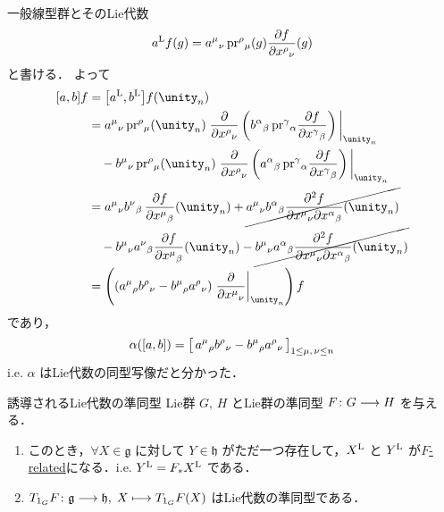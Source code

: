 \documentclass[TQFT_main]{subfiles}
\begin{document}
\begin{myexample}[label=ex:gl]{一般線型群とそのLie代数}
    \begin{align}
        a^{\mathrm{L}} f(g) = a^\mu{}_\nu\, \mathrm{pr}^\rho{}_\mu(g) \pdv{f}{x^\rho{}_\nu}()(g)
    \end{align}
    と書ける．
    よって
    \begin{align}
        \comm{a}{b} f
        &= \comm{\Lie{a}}{\Lie{b}} f (\unity_n)\\
        &= a^\mu{}_\nu\, \mathrm{pr}^\rho{}_\mu(\unity_n) \eval{\pdv{}{x^\rho{}_\nu}\left(b^\alpha{}_\beta\, \mathrm{pr}^\gamma{}_\alpha \pdv{f}{x^\gamma{}_\beta} \right)}_{\unity_n} \\
        &\quad - b^\mu{}_\nu\, \mathrm{pr}^\rho{}_\mu(\unity_n) \eval{\pdv{}{x^\rho{}_\nu}\left(a^\alpha{}_\beta\, \mathrm{pr}^\gamma{}_\alpha \pdv{f}{x^\gamma{}_\beta} \right)}_{\unity_n}\\
        &= a^\mu{}_\nu b^\nu{}_\beta\, \pdv{f}{x^\mu{}_\beta}()(\unity_n) + \cancel{a^\mu{}_\nu b^\alpha{}_\beta \pdv[2]{f}{x^\mu{}_\nu}{x^\alpha{}_\beta}()(\unity_n)} \\
        &\quad - b^\mu{}_\nu a^\nu{}_\beta \pdv{f}{x^\mu{}_\beta}()(\unity_n) - \cancel{b^\mu{}_\nu a^\alpha{}_\beta \pdv[2]{f}{x^\mu{}_\nu}{x^\alpha{}_\beta}()(\unity_n)} \\
        &= \left( (a^\mu{}_\rho b^\rho{}_\nu - b^\mu{}_\rho a^\rho{}_\nu) \eval{\pdv{}{x^\mu{}_\nu}}_{\unity_n}\right) f
    \end{align}
    であり，
    \begin{align}
        \alpha (\comm{a}{b}) = \bigl[\, a^\mu{}_\rho b^\rho{}_\nu - b^\mu{}_\rho a^\rho{}_\nu \,\bigr]_{1\le \mu,\, \nu \le n}
    \end{align}
    i.e. $\alpha$ はLie代数の同型写像だと分かった．
\end{myexample}


\begin{mytheo}[label=thm:induced-LieAlg-hom]{誘導されるLie代数の準同型}
    Lie群 $G,\, H$ とLie群の準同型 $F \colon G \longrightarrow H$ を与える．
    \begin{enumerate}
        \item このとき，$\forall X \in \mathfrak{g}$ に対して $Y \in \mathfrak{h}$ がただ一つ存在して，$X^{\mathrm{L}}$ と $Y^{\mathrm{L}}$ が\hyperref[def:F-related]{$F$-related}になる．i.e. $Y^{\mathrm{L}} = F_* X^{\mathrm{L}}$ である．
        \item $T_{1_G} F \colon \mathfrak{g} \longrightarrow \mathfrak{h},\; X \longmapsto T_{1_G}F(X)$ はLie代数の準同型である．
    \end{enumerate}
\end{mytheo}
\end{document}
